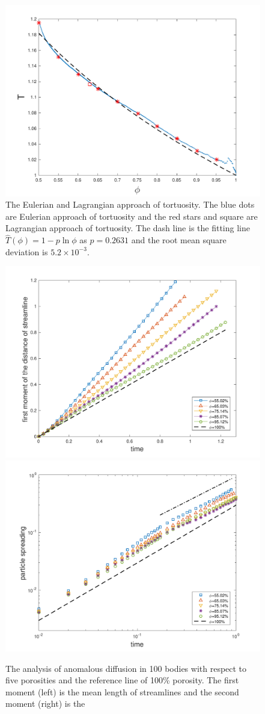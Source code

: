 \documentclass[preprint, 10pt]{elsarticle}
\begin{document}
\begin{figure}[H]
\center
\includegraphics*[width =0.5\linewidth]{./figs/tort_eulerian100}
\caption{\label{fig:Eroding100tort_all} The Eulerian and Lagrangian
approach of tortuosity.  The blue dots are Eulerian approach of
tortuosity and the red stars and square are Lagrangian approach of
tortuosity.  The dash line is the fitting line
$\widehat{T}(\phi)=1-p\ln\phi$ as $p=0.2631$ and the root mean square
deviation is $5.2 \times 10^{-3}$.}
\end{figure}

\begin{figure}[H]
\center
\includegraphics*[width =0.45\linewidth]{./figs/100b_first_moment}
\includegraphics*[width =0.45\linewidth]{./figs/100b_second_moment}
\caption{\label{fig:Eroding100anomalous} The analysis of anomalous
diffusion in 100 bodies with respect to five porosities and the
reference line of 100\% porosity.  The first moment (left) is the mean
length of streamlines and the second moment (right) is the 
}
\end{figure}
\end{document}
